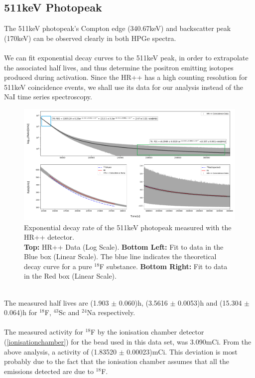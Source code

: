 \documentclass[]{article}
\begin{document}
\subsection{511keV Photopeak}
The 511keV photopeak's Compton edge (340.67keV) and backscatter peak (170keV) can be observed clearly in both HPGe spectra.\\\\
We can fit exponential decay curves to the 511keV peak, in order to extrapolate the associated half lives, and thus determine the positron emitting isotopes produced during activation. Since the HR++ has a high counting resolution for 511keV coincidence events, we shall use its data for our analysis instead of the NaI time series spectroscopy.
\begin{figure}[h!]
	\includegraphics[width = 18cm]{511BAYBII.png}
	\centering
	\captionsetup{justification=centering,margin=2cm}
	\caption{Exponential decay rate of the 511keV photopeak measured with the HR++ detector.\\ \textbf{Top:} HR++ Data (Log Scale). \textbf{Bottom Left:} Fit to data in the Blue box (Linear Scale). The blue line indicates the theoretical decay curve for a pure ${}^{18}$F substance. \textbf{Bottom Right:} Fit to data in the Red box (Linear Scale).}
	\label{fig:511HL}
\end{figure}~\\
The measured half lives are (1.903 $\pm$ 0.060)h, (3.5616 $\pm$ 0.0053)h and (15.304 $\pm$ 0.064)h for ${}^{18}$F, ${}^{43}$Sc and ${}^{24}$Na respectively.\\\\
The measured activity for ${}^{18}$F by the ionisation chamber detector (\ref{ionisationchamber}) for the bead used in this data set, was 3.090mCi. From the above analysis, a activity of (1.83520 $\pm$ 0.00023)mCi. This deviation is most probably due to the fact that the ionisation chamber assumes that all the emissions detected are due to ${}^{18}$F.
\end{document}
